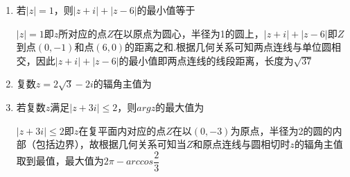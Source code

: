 \begin{enumerate}
        \item 若$|z| = 1$，则$|z+i|+|z-6|$的最小值等于
        \begin{jieda}
            $|z| = 1$即$z$所对应的点$Z$在以原点为圆心，半径为1的圆上，$|z+i|+|z-6|$即$Z$到点$(0, -1)$和点$(6,0)$的距离之和.根据几何关系可知两点连线与单位圆相交，因此$|z+i|+|z-6|$的最小值即两点连线的线段距离，长度为$\sqrt{37}$
        \end{jieda}

            
        \item 复数$z = 2\sqrt{3} - 2i$的辐角主值为

        \item 若复数$z$满足$|z+3i| \leq 2$，则$argz$的最大值为
        \begin{jieda}
            $|z+3i| \leq 2$即$z$在复平面内对应的点$Z$在以$(0, -3)$为原点，半径为2的圆的内部（包括边界），故根据几何关系可知当$Z$和原点连线与圆相切时$z$的辐角主值取到最值，最大值为$2\pi - arccos\dfrac{2}{3}$
        \end{jieda}
    \end{enumerate}